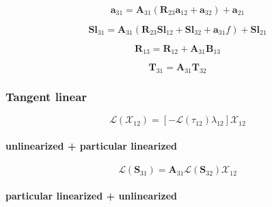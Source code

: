 \begin{equation}
\mathbf{a}_{31} = \mathbf{A}_{31}(\mathbf{R}_{23}\mathbf{a}_{12} + \mathbf{a}_{32}) + \mathbf{a}_{21}
\label{eq:adding-upward-forward-a31}
\end{equation}

\begin{equation}
\mathbf{Sl}_{31} = \mathbf{A}_{31}(\mathbf{R}_{23}\mathbf{Sl}_{12} + \mathbf{Sl}_{32} + \mathbf{a}_{31}f) + \mathbf{Sl}_{21}
\label{eq:adding-upward-forward-Sl31}
\end{equation}

\begin{equation}
\mathbf{R}_{13} = \mathbf{R}_{12} + \mathbf{A}_{31}\mathbf{B}_{13}
\label{eq:adding-upward-forward-R13}
\end{equation}

\begin{equation}
\mathbf{T}_{31} = \mathbf{A}_{31}\mathbf{T}_{32}
\label{eq:adding-upward-forward-T31}
\end{equation}


%
\subsubsection{Tangent linear}
\label{sec:adding-upward-tangent_linear}

\begin{equation}
\mathcal{L}(\mathcal{X}_{12}) = \left[-\mathcal{L}(\tau_{12}) \lambda_{12}\right]\mathcal{X}_{12}
\label{eq:adding-trans_l}
\end{equation}


\paragraph{unlinearized + particular linearized}
\label{sec:adding-upward-tangent_linear-unlinearized_p_particular_linearized}

\begin{equation}
\mathcal{L}(\mathbf{S}_{31}) = \mathbf{A}_{31}\mathcal{L}(\mathbf{S}_{32})\mathcal{X}_{12}
\label{eq:adding-upward-tangent_linear-unlinearized_p_particular_linearized-V31}
\end{equation}


\paragraph{particular linearized + unlinearized}
\label{sec:adding-upward-tangent_linear-particular_linearized_p_unlinearized}

